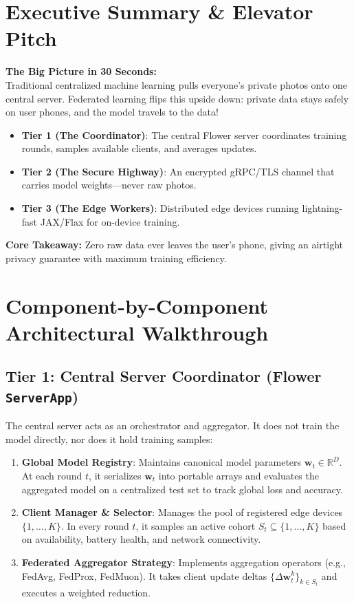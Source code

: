 \documentclass[11pt,a4paper,titlepage]{report}
\begin{document}
\section{Executive Summary \& Elevator Pitch}
\begin{elevatorpitch}
\textbf{The Big Picture in 30 Seconds:}\\
Traditional centralized machine learning pulls everyone's private photos onto one central server. Federated learning flips this upside down: private data stays safely on user phones, and the model travels to the data!
\begin{itemize}[leftmargin=*,itemsep=2pt]
    \item \textbf{Tier 1 (The Coordinator)}: The central Flower server coordinates training rounds, samples available clients, and averages updates.
    \item \textbf{Tier 2 (The Secure Highway)}: An encrypted gRPC/TLS channel that carries model weights—never raw photos.
    \item \textbf{Tier 3 (The Edge Workers)}: Distributed edge devices running lightning-fast JAX/Flax for on-device training.
\end{itemize}
\textbf{Core Takeaway:} Zero raw data ever leaves the user's phone, giving an airtight privacy guarantee with maximum training efficiency.
\end{elevatorpitch}

\section{Component-by-Component Architectural Walkthrough}
\subsection{Tier 1: Central Server Coordinator (Flower \texttt{ServerApp})}
The central server acts as an orchestrator and aggregator. It does not train the model directly, nor does it hold training samples:
\begin{enumerate}[leftmargin=*]
    \item \textbf{Global Model Registry}: Maintains canonical model parameters $\mathbf{w}_t \in \mathbb{R}^D$. At each round $t$, it serializes $\mathbf{w}_t$ into portable arrays and evaluates the aggregated model on a centralized test set to track global loss and accuracy.
    \item \textbf{Client Manager \& Selector}: Manages the pool of registered edge devices $\{1, \dots, K\}$. In every round $t$, it samples an active cohort $S_t \subseteq \{1, \dots, K\}$ based on availability, battery health, and network connectivity.
    \item \textbf{Federated Aggregator Strategy}: Implements aggregation operators (e.g., FedAvg, FedProx, FedMuon). It takes client update deltas $\{\Delta\mathbf{w}_t^k\}_{k \in S_t}$ and executes a weighted reduction.
\end{enumerate}
\end{document}
